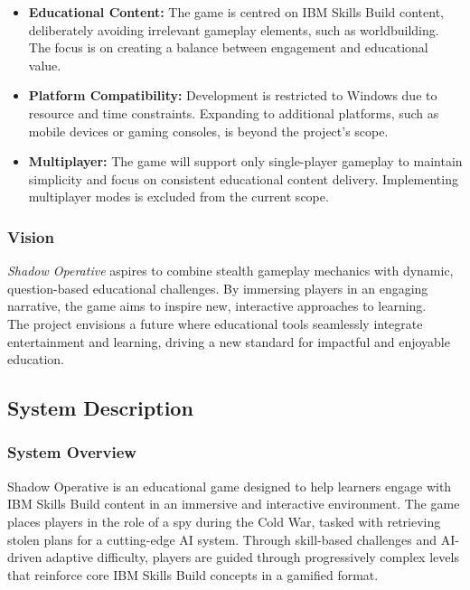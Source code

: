 \documentclass[11pt, a4paper]{article}
\begin{document}
\begin{itemize}
    \item \textbf{Educational Content:} The game is centred on IBM Skills Build content, deliberately avoiding irrelevant gameplay elements, such as worldbuilding. The focus is on creating a balance between engagement and educational value.

    \item \textbf{Platform Compatibility:} Development is restricted to Windows due to resource and time constraints. Expanding to additional platforms, such as mobile devices or gaming consoles, is beyond the project's scope.

    \item \textbf{Multiplayer:} The game will support only single-player gameplay to maintain simplicity and focus on consistent educational content delivery. Implementing multiplayer modes is excluded from the current scope.
\end{itemize}

\subsubsection{Vision}

\noindent \textit{Shadow Operative} aspires to combine stealth gameplay mechanics with dynamic, question-based educational challenges. By immersing players in an engaging narrative, the game aims to inspire new, interactive approaches to learning. \\

\noindent The project envisions a future where educational tools seamlessly integrate entertainment and learning, driving a new standard for impactful and enjoyable education.

\newpage

\subsection{System Description}

\subsubsection{System Overview}

\noindent Shadow Operative is an educational game designed to help learners engage with IBM Skills Build content in an immersive and interactive environment. The game places players in the role of a spy during the Cold War, tasked with retrieving stolen plans for a cutting-edge AI system. Through skill-based challenges and AI-driven adaptive difficulty, players are guided through progressively complex levels that reinforce core IBM Skills Build concepts in a gamified format.
\end{document}
